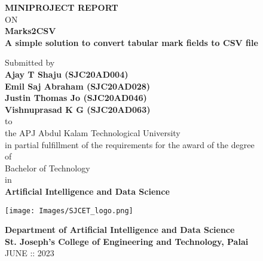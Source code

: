 \thispagestyle{empty}
\begin{center}
 
{\normalsize \bf MINIPROJECT REPORT}\\
ON\\
\vspace*{0.2 cm}
{\huge \bf Marks2CSV}\\
{\normalsize \bf A simple solution to convert tabular mark fields to CSV file}

   \vspace{0.5 cm}
   \large Submitted by\\
   { \bf Ajay T Shaju (SJC20AD004)}\\
   { \bf Emil Saj Abraham (SJC20AD028)}\\
   { \bf Justin Thomas Jo (SJC20AD046)}\\
   { \bf Vishnuprasad K G (SJC20AD063)}\\[-0.6mm]
  {\large to\\[-0.6mm] the APJ Abdul Kalam Technological University\\[-0.6mm] in partial fulfillment of the requirements for the award of the degree\\[-0.6mm] of\\[-0.6mm] Bachelor of Technology\\[-0.6mm] in\\[-0.6mm] {\bf Artificial Intelligence and Data Science}}
  
   \begin{center}
   \texttt{[image: Images/SJCET\_logo.png]}
   \end{center}
   \vspace*{-0.5cm}
  {\LARGE {\bf Department of Artificial Intelligence and Data Science}}\\
          [-3mm] {\large {\bf St. Joseph's College of Engineering and Technology, Palai}\\
           [1mm] JUNE :: 2023}

\end{center}
\newpage
\thispagestyle{empty}
